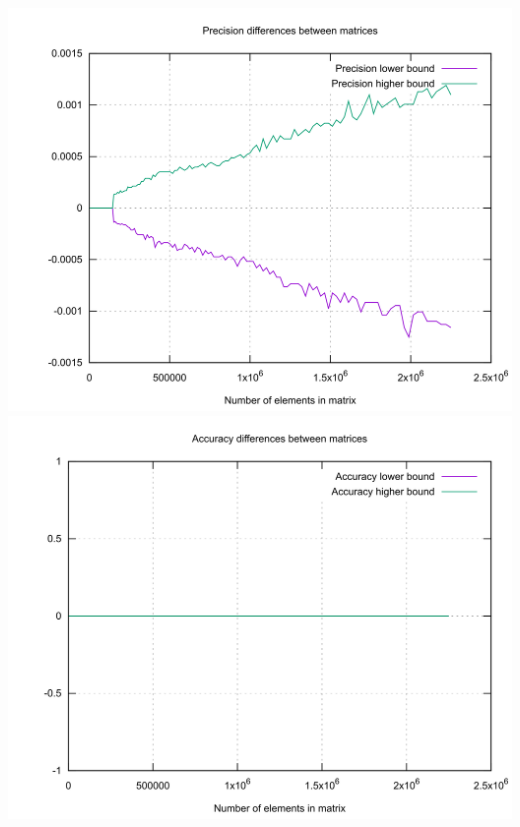 \documentclass[11pt, a4paper]{article}
\begin{document}
\begin{appendices}
    \newpage
    \includegraphics[width=\textwidth]{../../resources/matrix_naive_float_precision.png}
    \newpage
    \includegraphics[width=\textwidth]{../../resources/naive_integer_accuracy.png}

\end{appendices}
\end{document}
